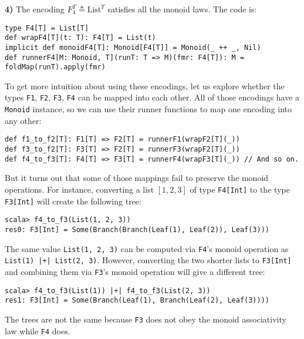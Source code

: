 \textbf{4)} The encoding $F_{4}^{T}\triangleq\text{List}^{T}$ satisfies
all the monoid laws. The code is:
\begin{lstlisting}
type F4[T] = List[T]
def wrapF4[T](t: T): F4[T] = List(t)
implicit def monoidF4[T]: Monoid[F4[T]] = Monoid(_ ++ _, Nil)
def runnerF4[M: Monoid, T](runT: T => M)(fmr: F4[T]): M = foldMap(runT).apply(fmr)
\end{lstlisting}
To get more intuition about using these encodings, let us explore
whether the types \lstinline!F1!,
\lstinline!F2!, \lstinline!F3!,
\lstinline!F4! can be mapped
into each other. All of those encodings have a \lstinline!Monoid!
instance, so we can use their runner functions to map one encoding
into any other:
\begin{lstlisting}
def f1_to_f2[T]: F1[T] => F2[T] = runnerF1(wrapF2[T](_))
def f3_to_f2[T]: F3[T] => F2[T] = runnerF3(wrapF2[T](_))
def f4_to_f3[T]: F4[T] => F3[T] = runnerF4(wrapF3[T](_)) // And so on.
\end{lstlisting}
But it turns out that some of those mappings fail to preserve the
monoid operations. For instance, converting a list $\left[1,2,3\right]$
of type \lstinline!F4[Int]!
to the type \lstinline!F3[Int]!
will create the following tree:
\begin{lstlisting}
scala> f4_to_f3(List(1, 2, 3))
res0: F3[Int] = Some(Branch(Branch(Leaf(1), Leaf(2)), Leaf(3)))
\end{lstlisting}
The same value \lstinline!List(1, 2, 3)!
can be computed via \lstinline!F4!\textsf{'}s
monoid operation as \lstinline!List(1) |+| List(2, 3)!.
However, converting the two shorter lists to \lstinline!F3[Int]!
and combining them via \lstinline!F3!\textsf{'}s
monoid operation will give a different tree:
\begin{lstlisting}
scala> f4_to_f3(List(1)) |+| f4_to_f3(List(2, 3))
res1: F3[Int] = Some(Branch(Leaf(1), Branch(Leaf(2), Leaf(3))))
\end{lstlisting}
The trees are not the same because \lstinline!F3!
does not obey the monoid associativity law while \lstinline!F4!
does. 

